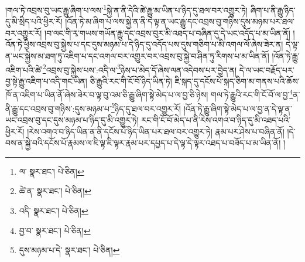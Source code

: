 །གལ་ཏེ་འབྲས་བུ་ཡང་རྒྱུ་ཞིག་པ་ལས་\footnote{ལ་  སྣར་ཐང་།  པེ་ཅིན། }སྐྱེ་ན་ནི་དེའི་ཚེ་རྒྱུ་མ་ཡིན་པ་ཉིད་དུ་ཐལ་བར་འགྱུར་ཏེ། ཞིག་པ་ནི་རྒྱུ་ཉིད་དུ་མི་སྲིད་པའི་ཕྱིར་རོ། །འོན་ཏེ་མ་ཞིག་པ་ལས་སྐྱེ་ན་ནི་དེ་ལྟ་ན་ཡང་རྒྱུ་དང་འབྲས་བུ་གཉིས་དུས་མཉམ་པར་ཐལ་བར་འགྱུར་རོ། །བ་ལང་གི་རྭ་གཡས་གཡོན་རྒྱུ་དང་འབྲས་བུར་མི་འཐད་པ་བཞིན་དུ་དེ་ཡང་འདོད་པ་མ་ཡིན་ནོ། །འོན་ཏེ་ཕྱིས་འབྲས་བུ་སྐྱེས་པ་དང་དུས་མཉམ་པ་དེ་ཉིད་དུ་འདོད་པས་དུས་གཅིག་པ་མི་འགལ་ལོ་ཞེས་ཟེར་ན། དེ་ལྟ་ན་ཡང་སྐྱེས་མ་ཐག་ཏུ་འཇིག་པ་དང་འགལ་བར་འགྱུར་བར་འབྲས་བུ་སྐྱེ་བ་ཤིན་ཏུ་རིགས་པ་མ་ཡིན་ནོ། །འོན་ཏེ་རྒྱུ་འཇིག་པའི་ཚེ་\footnote{ཚེ་ན་  སྣར་ཐང་།  པེ་ཅིན། }འབྲས་བུ་སྐྱེས་པས་:འདི་ལ་\footnote{འདི་  སྣར་ཐང་།  པེ་ཅིན། }ཉེས་པ་མེད་དོ་ཞེས་ལན་འདེབས་པར་བྱེད་ན། དེ་ལ་ཡང་བརྗོད་པར་བྱ་སྟེ་རྒྱུ་འཇིག་པ་འདི་གང་ཡིན། ཅི་རྒྱུའི་རང་གི་ངོ་བོ་ཉིད་ཡིན་ཏེ། ཇི་སྐད་དུ་དངོས་པོ་སྐད་ཅིག་མ་གནས་པའི་ཆོས་ཁོ་ན་འཇིག་པ་ཡིན་ནོ་ཞེས་ཟེར་བ་ལྟ་བུ་འམ་ཅི་རྒྱུ་ཞིག་སྟེ་མེད་པ་ལ་བྱ་ཅི་ཉེས། གལ་ཏེ་རྒྱུའི་རང་གི་ངོ་བོ་ལ་བྱ་\footnote{བྱ་བ་  སྣར་ཐང་།  པེ་ཅིན། }ན་ནི་རྒྱུ་དང་འབྲས་བུ་གཉིས་:དུས་མཉམ་པ་\footnote{དུས་མཉམ་པ་དེ་  སྣར་ཐང་།  པེ་ཅིན། }ཉིད་དུ་ཐལ་བར་འགྱུར་རོ། །འོན་ཏེ་རྒྱུ་ཞིག་སྟེ་མེད་པ་ལ་བྱ་ན་དེ་ལྟ་ན་ཡང་འབྲས་བུ་དང་དུས་མཉམ་པ་ཉིད་དུ་མི་འགྱུར་ཏེ། རང་གི་ངོ་བོ་མེད་པ་ནི་རེས་འགའ་བ་ཉིད་དུ་མི་འཐད་པའི་ཕྱིར་རོ། །རེས་འགའ་བ་ཉིད་ཡིན་ན་ནི་དངོས་པོ་ཉིད་ཡིན་པར་ཐལ་བར་འགྱུར་ཏེ། རྣམ་པར་ཤེས་པ་བཞིན་ནོ། །དེ་བས་ན་སྐྱེ་བའི་དངོས་པོ་རྣམས་ལ་ཇི་ལྟ་ཇི་ལྟར་རྣམ་པར་དཔྱད་པ་དེ་ལྟ་དེ་ལྟར་འཐད་པ་བཟོད་པ་མ་ཡིན་ནོ། །
